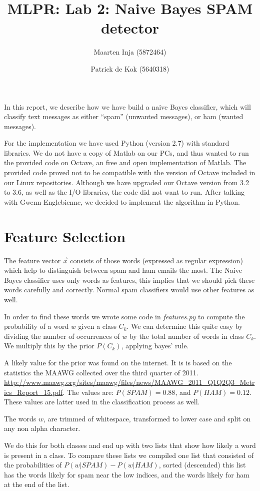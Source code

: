 \documentclass[a4paper,11pt]{article}
\author{Maarten Inja (5872464) \and Patrick de Kok (5640318)}
\title{MLPR: Lab 2: Naive Bayes SPAM detector}
\begin{document}
\maketitle

In this report, we describe how we have build a naive Bayes classifier, which will classify text messages as either ``spam'' (unwanted messages), or ham (wanted messages).  

For the implementation we have used Python (version 2.7) with standard libraries.  We do not have a copy of Matlab on our PCs, and thus wanted to run the provided code on Octave, an free and open implementation of Matlab.  The provided code proved not to be compatible with the version of Octave included in our Linux repositories.  Although we have upgraded our Octave version from 3.2 to 3.6, as well as the I/O libraries, the code did not want to run.  After talking with Gwenn Englebienne, we decided to implement the algorithm in Python. 

\section{Feature Selection}
The feature vector $\vec{x}$ consists of those words (expressed as 
regular expression) which 
help to distinguish between spam and ham emails the most. The Naive Bayes 
classifier uses only words as features, this implies that we should pick
these words carefully and correctly. Normal spam classifiers would use 
other features as well. 

In order to find these words we wrote some code in \textit{features.py} 
to compute the probability of a word $w$ given a class $C_k$. We can 
determine this quite easy by dividing the number of occurrences of 
$w$ by the total number of words in class $C_k$. We multiply this by 
the prior $P(C_k)$, applying bayes' rule. 

A likely value for the prior was found on the internet. It is 
is based on the statistics the MAAWG collected over the 
 third quarter of 2011.
 \url{http://www.maawg.org/sites/maawg/files/news/MAAWG_2011_Q1Q2Q3_Metrics_Report_15.pdf}. The values are: $P(SPAM) = 0.88$, and $P(HAM) = 0.12$. These 
values are latter used in the classification process as well.

The words $w$, are trimmed of whitespace, transformed to lower case and 
split on any non alpha character. 

We do this for both classes and end up with two lists that show how likely 
a word is present in a class. To compare these lists we compiled one list
that consisted of the probabilities of $P(w|SPAM) - P(w|HAM)$, sorted 
(descended) this 
list has the words likely for spam near the low indices, and the words likely
for ham at the end of the list. 
\end{document}
